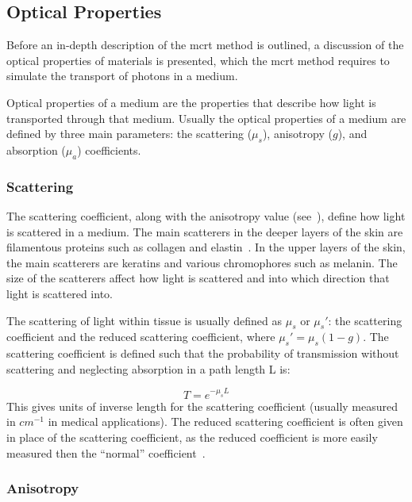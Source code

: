 \subsection{Optical Properties}\label{sec:optprop}

Before an in-depth description of the \gls*{mcrt} method is outlined, a discussion of the optical properties of materials is presented, which the \gls*{mcrt} method requires to simulate the transport of photons in a medium.

Optical properties of a medium are the properties that describe how light is transported through that medium. Usually the optical properties of a medium are defined by three main parameters: the scattering ($\mu_s$), anisotropy ($g$), and  absorption ($\mu_a$) coefficients.

\subsubsection*{Scattering}\label{sec:scatt}

The scattering coefficient, along with the anisotropy value (see~), define how light is scattered in a medium. The main scatterers in the deeper layers of the skin are filamentous proteins such as collagen and elastin~\cite{jacques1996origins}. In the upper layers of the skin, the main scatterers are keratins and various chromophores such as melanin. 
The size of the scatterers affect how light is scattered and into which direction that light is scattered into.

\medskip

The scattering of light within tissue is usually defined as $\mu_s$ or $\mu_s'$: the scattering coefficient and the reduced scattering coefficient, where $\mu_s'=\mu_s(1-g)$. The scattering coefficient is defined such that the probability of transmission without scattering and neglecting absorption in a path length L is:

\begin{equation}
	T=e^{-\mu_sL}
\end{equation}
This gives units of inverse length for the scattering coefficient (usually measured in $cm^{-1}$ in medical applications). The reduced scattering coefficient is often given in place of the scattering coefficient, as the reduced coefficient is more easily measured then the ``normal'' coefficient~\cite{jacques2013optical}.



\subsubsection*{Anisotropy}\label{sec:ansio}

